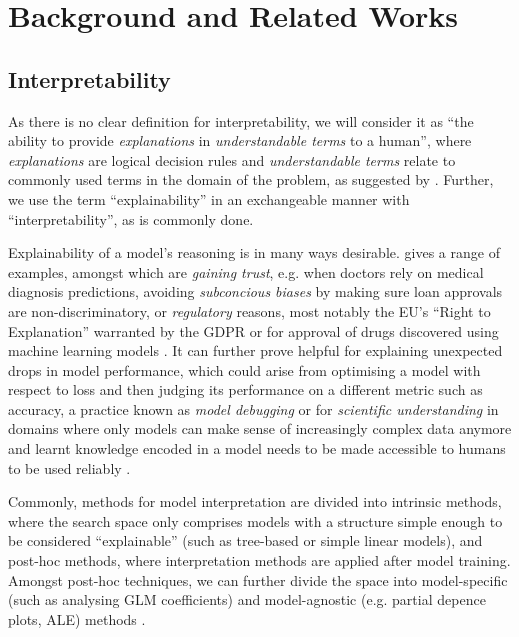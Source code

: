 \documentclass[twoside,11pt]{article}
\begin{document}


\section{Background and Related Works}

\subsection{Interpretability}
As there is no clear definition for interpretability, we will consider it as ``the ability to provide \textit{explanations} in \textit{understandable terms} to a human'',
where \textit{explanations} are logical decision rules and \textit{understandable terms} relate to commonly used terms in the domain of the problem,
as suggested by \citet[chap. 1]{survey_NN_interpretability}. Further, we use the term ``explainability'' in an exchangeable manner with ``interpretability'',
as is commonly done.

Explainability of a model's reasoning is in many ways desirable. \citet[pp. 3-4]{Zach2019InterpretabilityOD} gives a range of examples,
amongst which are \textit{gaining trust}, e.g. when doctors rely on medical diagnosis predictions, avoiding \textit{subconcious biases} by
making sure loan approvals are non-discriminatory, or \textit{regulatory} reasons, most notably the EU's ``Right to Explanation'' warranted by the
GDPR \citep[p. 1]{review_NN_interpretability} or for approval of drugs discovered using machine learning models \citep[1B]{survey_NN_interpretability}.
It can further prove helpful for explaining unexpected drops in model performance, which could arise from optimising a model with respect to loss and then judging its
performance on a different metric such as accuracy, a practice known as \textit{model debugging} \citep[1B]{survey_NN_interpretability} or for
\textit{scientific understanding} in domains where only models can make sense of increasingly complex data anymore and learnt knowledge encoded in a model needs to be
made accessible to humans to be used reliably \citep[p. 1]{review_NN_interpretability}.

Commonly, methods for model interpretation are divided into intrinsic methods, where the search space only comprises models with a structure simple enough to be
considered ``explainable'' (such as tree-based or simple linear models), and post-hoc methods, where interpretation methods are applied after model training.
Amongst post-hoc techniques, we can further divide the space into model-specific (such as analysing GLM coefficients) and model-agnostic
(e.g. partial depence plots, ALE) methods \citep[chap. 3.2]{molnar2022}.
\end{document}
